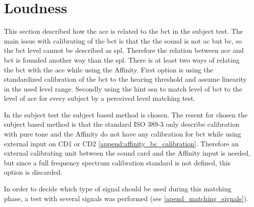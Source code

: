 
\section{Loudness}


This section described how the \gls{ace} is related to the \gls{bct} in the subject test. The main issue with calibrating of the \gls{bct} is that the the sound is not \gls{ac} but \gls{bc}, so the \gls{bct} level cannot be described as \gls{spl}. Therefore the relation between \gls{ace} and \gls{bct} is founded another way than the \gls{spl}. There is at least two ways of relating the \gls{bct} with the \gls{ace} while using the Affinity. First option is using the standardized calibration of the \gls{bct} to the hearing threshold and assume linearity in the used level range. Secondly using the \gls{hint} \gls{ssn} \citep{nilsson_95} to match level of \gls{bct} to the level of \gls{ace} for every subject by a perceived level matching test.

In the subject test the subject based method is chosen. The resent for chosen the subject based method is that the standard ISO 389-3 \citep{iso_389-3} only describe calibration with pure tone and the Affinity do not have any calibration for \gls{bct} while using external input on CD1 or CD2 \autoref{append:affinity_bc_calibration}. Therefore an external calibrating unit between the sound card and the Affinity input is needed, but since a full frequency spectrum calibration standard is not defined, this option is discarded.

In order to decide which type of signal should be used during this matching phase, a test with several signals was performed (see \autoref{apend_matching_signals}).